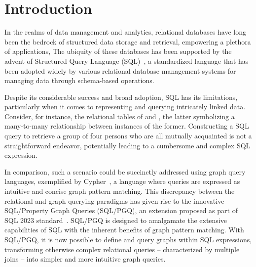 \section{Introduction}
\label{sec:introduction}

In the realms of data management and analytics, relational databases have long been the bedrock of structured data storage and retrieval, empowering a plethora of applications,%
The ubiquity of these databases has been supported by the advent of Structured Query Language (SQL)~\cite{chamberlin1974sequel}, a standardized language that has been adopted widely by various relational database management systems for managing data through schema-based operations. %

Despite its considerable success and broad adoption, SQL has its limitations, particularly when it comes to representing and querying intricately linked data. Consider, for instance, the relational tables of  and , the latter symbolizing a many-to-many relationship between instances of the former. Constructing a SQL query to retrieve a group of four persons who are all mutually acquainted is not a straightforward endeavor, potentially leading to a cumbersome and complex SQL expression.

In comparison, such a scenario could be succinctly addressed using graph query languages, exemplified by Cypher~\cite{opencypher}, a language where queries are expressed as intuitive and concise graph pattern matching. This discrepancy between the relational and graph querying paradigms has given rise to the innovative SQL/Property Graph Queries (SQL/PGQ), an extension proposed as part of SQL 2023 standard~\cite{sql-pgq}. SQL/PGQ is designed to amalgamate the extensive capabilities of SQL with the inherent benefits of graph pattern matching. With SQL/PGQ, it is now possible to define and query graphs within SQL expressions, transforming otherwise complex relational queries -- characterized by multiple joins -- into simpler and more intuitive graph queries.

